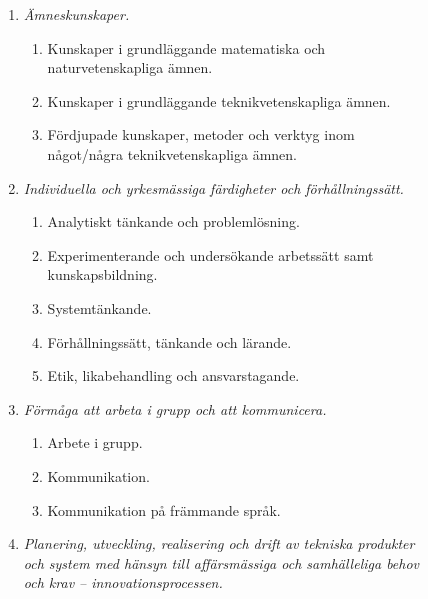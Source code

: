 \begin{figure}[tp]
\begin{tcbframe}
\begin{enumerate}
\def\labelenumi{\arabic{enumi}.}
\item \emph{Ämneskunskaper.}
\tightlist
  \begin{enumerate}
  \def\labelenumii{\arabic{enumi}.\arabic{enumii}.}
  \tightlist
   \item
    Kunskaper i grundläggande matematiska och naturvetenskapliga ämnen.
  \item
    Kunskaper i grundläggande teknikvetenskapliga ämnen.
  \item
    Fördjupade kunskaper, metoder och verktyg inom något/några
    teknikvetenskapliga ämnen.
  \end{enumerate}
\item
  \emph{Individuella och yrkesmässiga färdigheter och förhållningssätt.}

  \begin{enumerate}
  \def\labelenumii{\arabic{enumi}.\arabic{enumii}.}
  \tightlist
   \item
    Analytiskt tänkande och problemlösning.
  \item 
    Experimenterande och undersökande arbetssätt samt kunskapsbildning.  
  \item
    Systemtänkande.
  \item
    Förhållningssätt, tänkande och lärande.
  \item
    Etik, likabehandling och ansvarstagande.
  \end{enumerate}
\item
  \emph{Förmåga att arbeta i grupp och att kommunicera.}

  \begin{enumerate}
  \def\labelenumii{\arabic{enumi}.\arabic{enumii}.}
  \tightlist
   \item
    Arbete i grupp.
  \item
    Kommunikation.
  \item
    Kommunikation på främmande språk.
  \end{enumerate}
\item
  \emph{Planering, utveckling, realisering och drift av tekniska produkter och
  system med hänsyn till affärsmässiga och samhälleliga behov och krav -- innovationsprocessen.}


\end{enumerate}
\end{tcbframe}
\end{figure}
